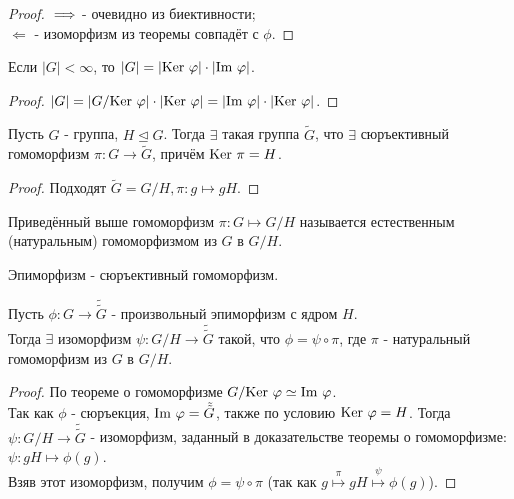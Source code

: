 \begin{proof}  
    $ \\ \Longrightarrow$ - очевидно из биективности;\\
    $\Longleftarrow$ - изоморфизм из теоремы совпадёт с $\phi$.  
\end{proof}
\begin{consequensenum}
    Если $|G| < \infty$, то $|G| = |\textup{Ker }\phi|\cdot|\textup{Im }\phi|$.
\end{consequensenum}
\begin{proof}
    $|G| = |G/\textup{Ker }\phi|\cdot|\textup{Ker }\phi| = |\textup{Im }\phi| \cdot |\textup{Ker }\phi|$.
\end{proof}
\begin{subtheorem}
    Пусть $G$ - группа, $H \unlhd G$. Тогда $\exists$ такая группа $\tilde{G}$, что $\exists$ сюръективный гомоморфизм $\pi: G \rightarrow \tilde{G}$, причём $\textup{Ker }\pi = H$.
\end{subtheorem}
\begin{proof}
    Подходят $\tilde{G} = G/H, \pi: g \mapsto gH$.
\end{proof}
\begin{definition}
    Приведённый выше гомоморфизм $\pi: G \mapsto G/H$ называется естественным (натуральным) гомоморфизмом из $G$ в $G/H$.
\end{definition}
\begin{definition}
    Эпиморфизм - сюръективный гомоморфизм.
\end{definition}
\begin{subtheorem}
    Пусть $\phi: G \rightarrow \tilde{\tilde{G}}$ - произвольный эпиморфизм с ядром $H$.\\
    Тогда $\exists$ изоморфизм $\psi: G/H \rightarrow \tilde{\tilde{G}}$ такой, что $\phi = \psi \circ \pi$, где $\pi$ - натуральный гомоморфизм из $G$ в $G/H$.
\end{subtheorem}
\begin{proof}
    По теореме о гомоморфизме $G/ \textup{Ker }\phi \simeq \textup{Im }\phi$.\\
    Так как $\phi$ - сюръекция, $\textup{Im }\phi =  \tilde{\tilde{G}}$, также по условию $\textup{Ker }\phi = H$. Тогда $\psi: G/H \rightarrow \tilde{\tilde{G}}$ - изоморфизм, заданный в доказательстве теоремы о гомоморфизме: $\psi: gH \mapsto \phi(g)$.\\
    Взяв этот изоморфизм, получим $\phi = \psi \circ \pi$ (так как $g \overset{\pi}{\mapsto} gH \overset{\psi}{\mapsto} \phi(g)$).
\end{proof}
\setcounter{thcount}{0}
\setcounter{concount}{0}
\setcounter{subthcount}{0}
\newpage